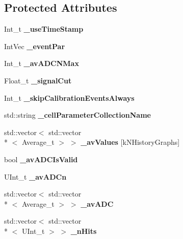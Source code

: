 \subsection*{Protected Attributes}
\begin{DoxyCompactItemize}
\item 
Int\-\_\-t {\bfseries \-\_\-use\-Time\-Stamp}\label{classCALICE_1_1AverageHistoryGraphs_a924519564a5a56335cc071811de29594}

\item 
Int\-Vec {\bfseries \-\_\-event\-Par}\label{classCALICE_1_1AverageHistoryGraphs_a9cd19052bd65b4925f23feaa915086c3}

\item 
Int\-\_\-t {\bfseries \-\_\-av\-A\-D\-C\-N\-Max}\label{classCALICE_1_1AverageHistoryGraphs_aaea631c4dde12b4da4274e9028b5bfa8}

\item 
Float\-\_\-t {\bfseries \-\_\-signal\-Cut}\label{classCALICE_1_1AverageHistoryGraphs_abe695f79dbd74292894bc9e8b53a3324}

\item 
Int\-\_\-t {\bfseries \-\_\-skip\-Calibration\-Events\-Always}\label{classCALICE_1_1AverageHistoryGraphs_a83a1b6b057c3e5c5b01aea6442864ed5}

\item 
std\-::string {\bfseries \-\_\-cell\-Parameter\-Collection\-Name}\label{classCALICE_1_1AverageHistoryGraphs_a1eca22a5971a5a7d480ae8f9c14f74fb}

\item 
std\-::vector$<$ std\-::vector\\*
$<$ Average\-\_\-t $>$ $>$ {\bfseries \-\_\-av\-Values} [k\-N\-History\-Graphs]\label{classCALICE_1_1AverageHistoryGraphs_ae0b1ef124d0704af661c3a6cff2c793a}

\item 
bool {\bfseries \-\_\-av\-A\-D\-C\-Is\-Valid}\label{classCALICE_1_1AverageHistoryGraphs_ac8f0ccd575282d74f9239f93e662faf7}

\item 
U\-Int\-\_\-t {\bfseries \-\_\-av\-A\-D\-Cn}\label{classCALICE_1_1AverageHistoryGraphs_adcdef8bfa777ecd9977e6e4c03b6177b}

\item 
std\-::vector$<$ std\-::vector\\*
$<$ Average\-\_\-t $>$ $>$ {\bfseries \-\_\-av\-A\-D\-C}\label{classCALICE_1_1AverageHistoryGraphs_a09f9a1eb99e16951c1bb2219690d0332}

\item 
std\-::vector$<$ std\-::vector\\*
$<$ U\-Int\-\_\-t $>$ $>$ {\bfseries \-\_\-n\-Hits}\label{classCALICE_1_1AverageHistoryGraphs_a9ac965b72b8eaf330366d65ca3e6bb40}


\end{DoxyCompactItemize}
